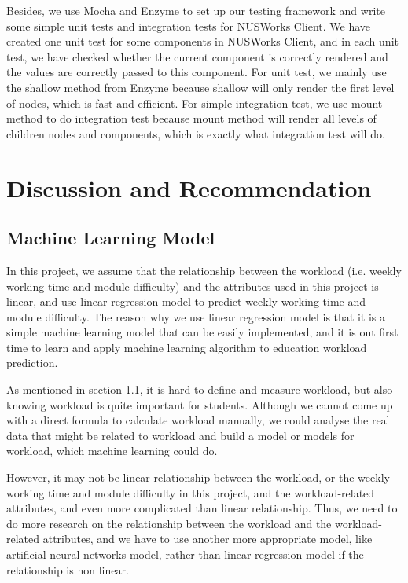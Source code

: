 \documentclass[fyp]{socreport}
\begin{document}
Besides, we use Mocha and Enzyme to set up our testing framework and write some simple unit tests and integration tests for NUSWorks Client. We have created one unit test for some components in NUSWorks Client, and in each unit test, we have checked whether the current component is correctly rendered and the values are correctly passed to this component. For unit test, we mainly use the shallow method from Enzyme because shallow will only render the first level of nodes, which is fast and efficient. For simple integration test, we use mount method to do integration test because mount method will render all levels of children nodes and components, which is exactly what integration test will do.

\chapter{Discussion and Recommendation}
\section{Machine Learning Model}
In this project, we assume that the relationship between the workload (i.e. weekly working time and module difficulty) and the attributes used in this project is linear, and use linear regression model to predict weekly working time and module difficulty. The reason why we use linear regression model is that it is a simple machine learning model that can be easily implemented, and it is out first time to learn and apply machine learning algorithm to education workload prediction.

As mentioned in section 1.1, it is hard to define and measure workload, but also knowing workload is quite important for students. Although we cannot come up with a direct formula to calculate workload manually, we could analyse the real data that might be related to workload and build a model or models for workload, which machine learning could do.

However, it may not be linear relationship between the workload, or the weekly working time and module difficulty in this project, and the workload-related attributes, and even more complicated than linear relationship. Thus, we need to do more research on the relationship between the workload and the workload-related attributes, and we have to use another more appropriate model, like artificial neural networks model, rather than linear regression model if the relationship is non linear.
\end{document}
